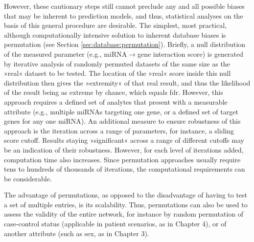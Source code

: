 However, these cautionary steps still cannot preclude any and all possible biases that may be inherent to prediction models, and thus, statistical analyses on the basis of this general procedure are desirable. The simplest, most practical, although computationally intensive solution to inherent database biases is permutation (see Section \ref{sec:database:permutation}). Briefly, a null distribution of the measured parameter (e.g., miRNA$\to$gene interaction score) is generated by iterative analysis of randomly permuted datasets of the same size as the »real« dataset to be tested. The location of the »real« score inside this null distribution then gives the »extremity« of that real result, and thus the likelihood of the result being as extreme by chance, which equals \acf{fdr}. However, this approach requires a defined set of analytes that present with a measurable attribute (e.g., multiple miRNAs targeting one gene, or a defined set of target genes for any one miRNA). An additional measure to ensure robustness of this approach is the iteration across a range of parameters, for instance, a sliding score cutoff. Results staying »significant« across a range of different cutoffs may be an indication of their robustness. However, for each level of iterations added, computation time also increases. Since permutation approaches usually require tens to hundreds of thousands of iterations, the computational requirements can be considerable.

The advantage of permutations, as opposed to the disadvantage of having to test a set of multiple entries, is its scalability. Thus, permutations can also be used to assess the validity of the entire network, for instance by random permutation of case-control status (applicable in patient scenarios, as in Chapter 4), or of another attribute (such as sex, as in Chapter 3).

